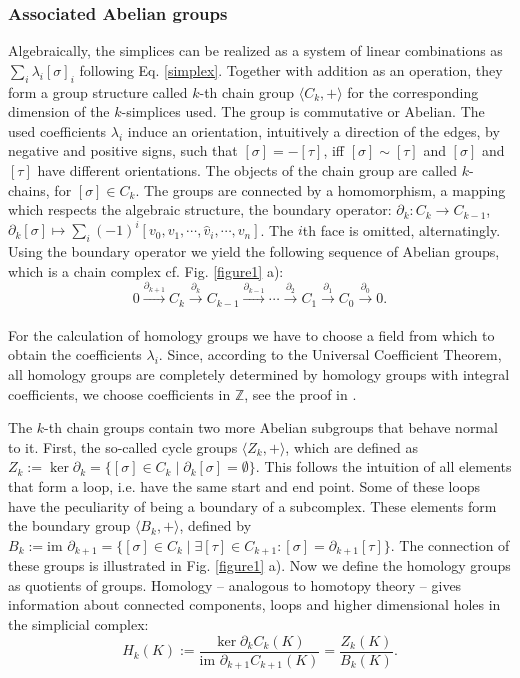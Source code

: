 \documentclass[runningheads,orivec]{llncs}
\begin{document}
\subsubsection{Associated Abelian groups} Algebraically, the simplices can be realized as a system of linear combinations as $\sum_i \lambda_i [\sigma]_{i}$ following Eq. \ref{simplex}. Together with addition as an operation, they form a group structure called $k$-th chain group $\langle C_k, +\rangle$ for the corresponding dimension of the $k$-simplices used. The group is commutative or Abelian. The used coefficients $\lambda_i$ induce an orientation, intuitively a direction of the edges, by negative and positive signs, such that $[\sigma] = -[\tau]$, iff $[\sigma] \sim [\tau]$ and $[\sigma]$ and $[\tau]$ have different orientations. The objects of the chain group are called $k$-chains, for $[\sigma] \in C_k$. The groups are connected by a homomorphism, a mapping which respects the algebraic structure, the boundary operator: $\partial_k: C_k \rightarrow C_{k-1}$, $\partial_k [\sigma] \mapsto \sum_i (-1)^i [v_0,v_1,\cdots,\hat{v}_i, \cdots, v_n]$. The $i$th face is omitted, alternatingly. Using the boundary operator we yield the following sequence of Abelian groups, which is a chain complex cf. Fig. \ref{figure1} a):
\begin{equation}
    0 \xrightarrow[]{\partial_{k+1}} C_k \xrightarrow[]{\partial_{k}} C_{k-1} \xrightarrow[]{\partial_{k-1}} \cdots \xrightarrow[]{\partial_{2}} C_1 \xrightarrow[]{\partial_{1}} C_0 \xrightarrow[]{\partial_{0}} 0.
\end{equation}

For the calculation of homology groups we have to choose a field from which to obtain the coefficients $\lambda_i$. Since, according to the Universal Coefficient Theorem, all homology groups are completely determined by homology groups with integral coefficients, we choose coefficients in $\mathbb{Z}$, see the proof in \cite{gruenberg1968universal}.

The $k$-th chain groups contain two more Abelian subgroups that behave normal to it. First, the so-called cycle groups $\langle Z_k, +\rangle$, which are defined as $Z_k := \ker \partial_k = \{[\sigma] \in C_k \; \vert \; \partial_k [\sigma] = \emptyset \}$. This follows the intuition of all elements that form a loop, i.e. have the same start and end point. Some of these loops have the peculiarity of being a boundary of a subcomplex. These elements form the boundary group $\langle B_k, +\rangle$, defined by $B_k := \text{im } \partial_{k+1} = \{[\sigma] \in C_k \; \vert \; \exists [\tau] \in C_{k+1}: [\sigma] = \partial_{k+1}[\tau]\}$. The connection of these groups is illustrated in Fig. \ref{figure1} a). Now we define the homology groups as quotients of groups. Homology -- analogous to homotopy theory -- gives information about connected components, loops and higher dimensional holes in the simplicial complex:
\begin{equation}
    H_k(K) := \frac{\ker \partial_k C_k(K)}{\text{im } \partial_{k+1} C_{k+1}(K)} = \frac{Z_k(K)}{B_k(K)}.
\end{equation}
\end{document}
